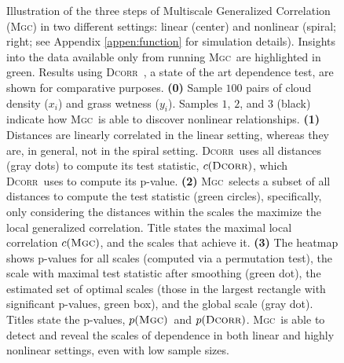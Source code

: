 \documentclass[11pt]{article}
\providecommand{\sct}[1]{{\normalfont\textsc{#1}}}
\newcommand{\GG}{c}
\newcommand{\Mgc}{\sct{Mgc}}
\newcommand{\Dcorr}{\sct{Dcorr}}
\begin{document}
\begin{figure}
\ContinuedFloat
\caption{Illustration of the three steps of Multiscale Generalized Correlation (\Mgc) in two different settings: linear (center) and nonlinear (spiral; right; see Appendix \ref{appen:function} for simulation details). Insights into the data available only from running \Mgc~are highlighted in green.  Results using \Dcorr~\cite{SzekelyRizzo2009}, a state of the art dependence test, are shown for comparative purposes. 
\textbf{(0)}  Sample $100$ pairs of cloud density ($x_i$) and grass wetness ($y_i$). 
Samples $1$, $2$, and $3$ (black) indicate how \Mgc~is able to discover nonlinear relationships. 
% 
\textbf{(1)} Distances are linearly correlated in the linear setting, whereas they are, in general, not in the spiral setting.  \Dcorr~uses all distances (gray dots) to compute its test statistic, $\GG(\Dcorr)$, which \Dcorr~uses to compute its p-value.
% 
\textbf{(2)} \Mgc~selects a subset of all distances to compute the test statistic (green circles), specifically, only considering the distances within the scales the maximize the local generalized correlation. Title states the maximal local correlation $\GG(\Mgc)$, and the scales that achieve it.
% 
\textbf{(3)}
The heatmap shows p-values for all scales (computed via a permutation test), the scale with maximal test statistic after smoothing (green dot), the estimated set of optimal scales  (those in the largest rectangle with significant p-values, green box), and the global scale (gray dot). 
Titles state the p-values,  $p(\Mgc)$~and $p(\Dcorr)$.
% 
\Mgc~is able to detect and reveal the scales of dependence in both linear and highly nonlinear settings, even  with low sample sizes.}
\end{figure}
\end{document}
